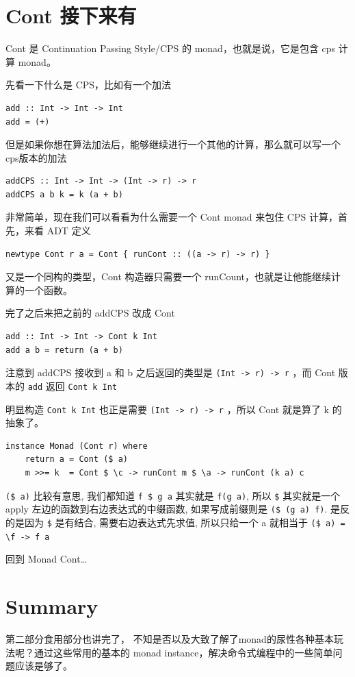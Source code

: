 \documentclass[11pt]{tufte-book}
\begin{document}
\chapter{Cont 接下来有}
\label{sec:org11a1a3d}
Cont 是 Continuation Passing Style/CPS 的 monad，也就是说，它是包含 cps 计算 monad。

先看一下什么是 CPS，比如有一个加法
\begin{verbatim}
add :: Int -> Int -> Int
add = (+)
\end{verbatim}

但是如果你想在算法加法后，能够继续进行一个其他的计算，那么就可以写一个 cps版本的加法
\begin{verbatim}
addCPS :: Int -> Int -> (Int -> r) -> r
addCPS a b k = k (a + b)
\end{verbatim}

非常简单，现在我们可以看看为什么需要一个 Cont monad 来包住 CPS 计算，首先，来看 ADT 定义
\begin{verbatim}
newtype Cont r a = Cont { runCont :: ((a -> r) -> r) }
\end{verbatim}

又是一个同构的类型，Cont 构造器只需要一个 runCount，也就是让他能继续计算的一个函数。

完了之后来把之前的 addCPS 改成 Cont
\begin{verbatim}
add :: Int -> Int -> Cont k Int
add a b = return (a + b)
\end{verbatim}

注意到 addCPS 接收到 a 和 b 之后返回的类型是 \texttt{(Int -> r) -> r} ，而 Cont 版本的 \texttt{add} 返回 \texttt{Cont k Int}

明显构造 \texttt{Cont k Int} 也正是需要 \texttt{(Int -> r) -> r} ，所以 Cont 就是算了 k 的抽象了。

\begin{verbatim}
instance Monad (Cont r) where
    return a = Cont ($ a)
    m >>= k  = Cont $ \c -> runCont m $ \a -> runCont (k a) c
\end{verbatim}

\texttt{(\$ a)} 比较有意思, 我们都知道 \texttt{f \$ g a} 其实就是 \texttt{f(g a)}, 所以 \texttt{\$} 其实就是一个 apply 左边的函数到右边表达式的中缀函数, 如果写成前缀则是
\texttt{(\$ (g a) f)}. 是反的是因为 \texttt{\$} 是有结合, 需要右边表达式先求值, 所以只给一个 a 就相当于 \texttt{(\$ a) = \textbackslash{}f -> f a}

回到 Monad Cont\ldots{}

\chapter{Summary}
\label{sec:orgd1fdd56}
第二部分食用部分也讲完了， 不知是否以及大致了解了monad的尿性各种基本玩法呢？通过这些常用的基本的 monad instance，解决命令式编程中的一些简单问题应该是够了。
\end{document}
